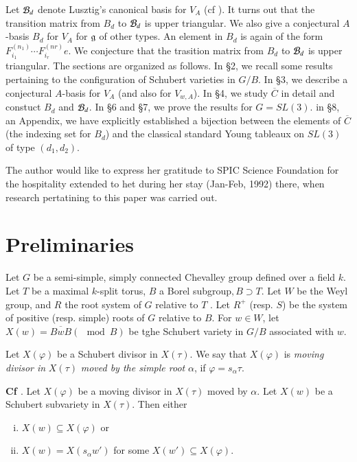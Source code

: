 Let $\mathcal{B}_{d}$ denote Lusztig's canonical basis for $V_{A}$ (cf \cite{art9-keyL2}). It turns out that the transition matrix from $B_{d}$ to $\mathcal{B}_{d}$ is upper triangular. We also give a conjectural $A$-basis $B_{d}$ for $V_{A}$ for $\mathfrak{g}$ of other types. An element in $B_{d}$ is again of the form $F_{i_{1}}^{(n_{1})}\cdots F_{i_{r}}^{(nr)}e$. We conjecture that the trasition matrix from $B_{d}$ to $\mathcal{B}_{d}$ is upper triangular. The sections are organized as follows. In \S2,
we recall some results pertaining to the configuration of Schubert varieties in $G/B$. In \S3, we describe a conjectural $A$-basis  for $V_{A}$ (and also for $V_{w, A}$). In \S4, we study $\overline{C}$ in detail and constuct $B_{d}$ and $\mathcal{B}_{d}$. In \S6 and \S7, we prove the results for $G=SL(3)$. in \S8, an Appendix, we have explicitly established a bijection between the elements of $\overline{C}$ (the indexing set for $B_{d}$) and the classical standard Young tableaux on $SL(3)$ of type $(d_{1}, d_{2})$.

The author would like to express her gratitude to SPIC Science Foundation for the hospitality extended to het during her stay (Jan-Feb, 1992) there, when research pertatining to this paper was carried out.

\section{Preliminaries}\label{art9-sec-2}

Let $G$ be a semi-simple, simply connected Chevalley group defined over a field $k$. Let $T$ be a maximal $k$-split torus, $B$ a Borel subgroup$, B\supset T$. Let $W$ be the Weyl group, and $R$ the root system of $G$ relative to $T$ . Let $R^{+}$ (resp. $S$) be the system of positive (resp. simple) roots of $G$ relative to $B$. For $w \in W$, let $X(w) = \overline{BwB}(\mod B)$ be tghe Schubert variety in $G/B$ associated with $w$.

\begin{definition}\label{art9-definition-2.1}
Let $X(\varphi)$ be a Schubert divisor in $X(\tau)$. We say that $X(\varphi)$ is \textit{moving divisor in} $X(\tau)$ \textit{moved by the simple root} $\alpha$, if $\varphi=s_{\alpha} \tau$.
\end{definition}

\begin{lemma}\label{art9-lemma-2.2}
{\bf Cf \cite{art9-keyLS}}. Let $X(\varphi)$ be a moving divisor in $X(\tau)$ moved by $\alpha$. Let $X(w)$ be a Schubert subvariety in $X(\tau)$. Then either
\begin{enumerate}[(i)]
\item $X(w) \subseteq X(\varphi)$ or\label{art9-lemma2.2-enum-1}
\item $X(w) = X(s_{\alpha}w')$ for some $X(w') \subseteq X(\varphi)$.\label{art9-lemma2.2-enum-2}
\end{enumerate}
\end{lemma}

